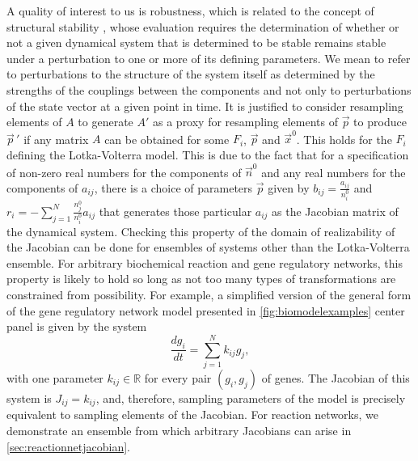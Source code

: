 A quality of interest to us is robustness, which is related to the concept of structural stability \cite{Smale1967}, whose evaluation requires the determination of whether or not a given dynamical system that is determined to be stable remains stable under a perturbation to one or more of its defining parameters. We mean to refer to perturbations to the structure of the system itself as determined by the strengths of the couplings between the components and not only to perturbations of the state vector at a given point in time. It is justified to consider resampling elements of $A$ to generate $A'$ as a proxy for resampling elements of $\vec{p}$ to produce $\vec{p}\,'$ if any matrix $A$ can be obtained for some $F_i$, $\vec{p}$ and $\vec{x}^0$. This holds for the $F_i$ defining the Lotka-Volterra model. This is due to the fact that for a specification of non-zero real numbers for the components of $\vec{n}^0$ and any real numbers for the components of $a_{ij}$, there is a choice of parameters $\vec{p}$ given by $b_{ij} = \frac{a_{ij}}{n_i^0}$ and $r_i = - \sum_{j=1}^N \frac{n_j^0}{n_i^0} a_{ij}$ that generates those particular $a_{ij}$ as the Jacobian matrix of the dynamical system. Checking this property of the domain of realizability of the Jacobian can be done for ensembles of systems other than the Lotka-Volterra ensemble. For arbitrary biochemical reaction and gene regulatory networks, this property is likely to hold so long as not too many types of transformations are constrained from possibility. For example, a simplified version of the general form of the gene regulatory network model presented in \ref{fig:biomodelexamples} center panel is given by the system
\begin{equation}
\frac{dg_i}{dt} = \sum_{j=1}^N k_{ij} g_j,
\end{equation}
with one parameter $k_{ij} \in \mathbb{R}$ for every pair $(g_i,g_j)$ of genes. The Jacobian of this system is $J_{ij} = k_{ij}$, and, therefore, sampling parameters of the model is precisely equivalent to sampling elements of the Jacobian. For reaction networks, we demonstrate an ensemble from which arbitrary Jacobians can arise in \ref{sec:reactionnetjacobian}.


